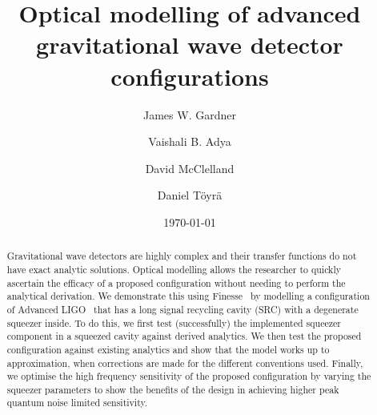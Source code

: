 \documentclass[aps,pra,superscriptaddress,reprint,nofootinbib]{revtex4-1}
\begin{document}
\title{Optical modelling of advanced gravitational wave detector configurations}

\author{James W. Gardner}

\author{Vaishali B. Adya}

\author{David McClelland}

\author{Daniel Töyrä}

\date{\today}


\begin{abstract}

Gravitational wave detectors are highly complex and their transfer functions do not have exact analytic solutions. Optical modelling allows the researcher to quickly ascertain the efficacy of a proposed configuration without needing to perform the analytical derivation. We demonstrate this using Finesse~\cite{finesse} by modelling a configuration of Advanced LIGO~\cite{AdvancedLIGO:2015} that has a long signal recycling cavity (SRC) with a degenerate squeezer inside. To do this, we first test (successfully) the implemented squeezer component in a squeezed cavity against derived analytics. We then test the proposed configuration against existing analytics and show that the model works up to approximation, when corrections are made for the different conventions used. Finally, we optimise the high frequency sensitivity of the proposed configuration by varying the squeezer parameters to show the benefits of the design in achieving higher peak quantum noise limited sensitivity.

\end{abstract}
\end{document}
